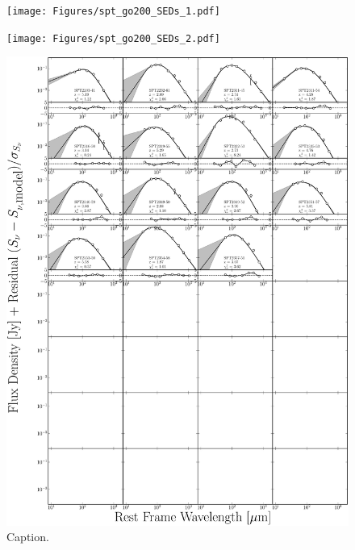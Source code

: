 \begin{figure}
	\centering
	\texttt{[image: Figures/spt\_go200\_SEDs\_1.pdf]}
\end{figure}
\begin{figure}
	\centering
	\texttt{[image: Figures/spt\_go200\_SEDs\_2.pdf]}
\end{figure}
\begin{figure}
	\centering
	\includegraphics[width=\columnwidth]{Figures/spt_go200_SEDs_3.pdf}
	\caption{Caption.}
\end{figure}
